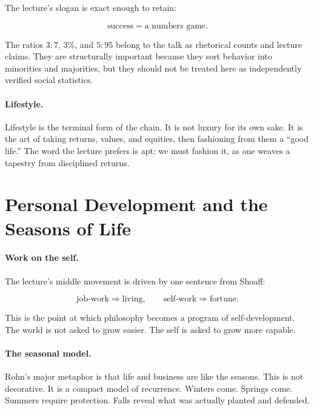 The lecture's slogan is exact enough to retain:

\begin{equation}
\text{success} = \text{a numbers game}.
\end{equation}

\begin{remark}
The ratios \(3:7\), \(3\%\), and \(5:95\) belong to the talk as rhetorical counts and lecture claims. They are structurally important because they sort behavior into minorities and majorities, but they should not be treated here as independently verified social statistics.
\end{remark}

\paragraph{Lifestyle.}
Lifestyle is the terminal form of the chain. It is not luxury for its own sake. It is the art of taking returns, values, and equities, then fashioning from them a ``good life.'' The word the lecture prefers is apt: we must fashion it, as one weaves a tapestry from disciplined returns.

\section{Personal Development and the Seasons of Life}

\paragraph{Work on the self.}
The lecture's middle movement is driven by one sentence from Shoaff:

\begin{equation}
\text{job-work}\Rightarrow \text{living}, \qquad \text{self-work}\Rightarrow \text{fortune}.
\end{equation}

This is the point at which philosophy becomes a program of self-development. The world is not asked to grow easier. The self is asked to grow more capable.

\paragraph{The seasonal model.}
Rohn's major metaphor is that life and business are like the seasons. This is not decorative. It is a compact model of recurrence. Winters come. Springs come. Summers require protection. Falls reveal what was actually planted and defended.

